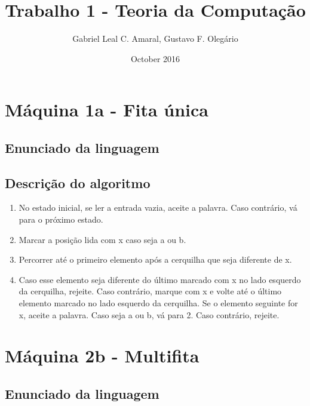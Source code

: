 \documentclass{article}
\title{Trabalho 1 - Teoria da Computação}
\author{Gabriel Leal C. Amaral, Gustavo F. Olegário}
\date{October 2016}
\begin{document}
\maketitle
\section{Máquina 1a - Fita única}
    \subsection{Enunciado da linguagem}
    \subsection{Descrição do algoritmo}
        \begin{enumerate}
        \item No estado inicial, se ler a entrada vazia, aceite a palavra. Caso contrário, vá para o próximo estado.
        \item Marcar a posição lida com x caso seja a ou b.
        \item Percorrer até o primeiro elemento após a cerquilha que seja diferente de x.
        \item Caso esse elemento seja diferente do último marcado com x no lado esquerdo da cerquilha, rejeite. Caso contrário, marque com x e volte até o último elemento marcado no lado esquerdo da cerquilha. Se o elemento seguinte for x, aceite a palavra. Caso seja a ou b, vá para 2. Caso contrário, rejeite.
        \end{enumerate}
\section{Máquina 2b - Multifita}
    \subsection{Enunciado da linguagem}
\end{document}

